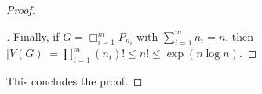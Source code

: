 \documentclass[10pt,a4paper]{amsart}
\newcommand{\car}{\mathbin{\Box}}
\renewcommand{\leq}{\leqslant}
\begin{document}
\begin{proof}
  \begin{proof}[]\let\qed\relax
    Finally, if $G= \car_{i=1}^m P_{n_i}$ with $\sum_{i=1}^m n_i =n$, then $|V(G)| = \prod_{i=1}^m (n_i)! \leq n! \leq \exp( n \log n)$.
  \end{proof}
  This concludes the proof.
\end{proof}
\end{document}
